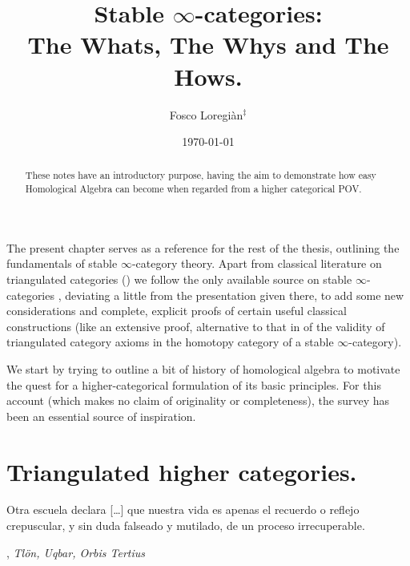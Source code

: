 \documentclass[11pt, a4paper]{amsart}
\providecommand{\omissis}{[\dots\unkern] }
\def\DefaultEpigraphWidth{.4\textwidth}
\begin{document}
\title[Lurification]{Stable $\infty$-categories: \\ The Whats, The Whys and The Hows. }
 
	\author[F. Loregian]{Fosco Loregi\`an${}^\ddag$}
		
\date{\today}

\begin{abstract}
These notes have an introductory purpose, having the aim to demonstrate how easy Homological Algebra can become when regarded from a higher categorical POV.
\end{abstract}

\subjclass[2010]{}
\maketitle 

The present chapter serves as a reference for the rest of the thesis, outlining the fundamentals of stable $\infty$-category theory. Apart from classical literature on triangulated categories (\cite{Hol,Nee}) we follow the only available source on stable $\infty$-categories \cite{LurieHA}, deviating a little from the presentation given there, to add some new considerations and complete, explicit proofs of certain useful classical constructions (like an extensive proof, alternative to that in \cite{LurieHA} of the validity of triangulated category axioms in the homotopy category of a stable $\infty$-category). 

We start by trying to outline a bit of history of homological algebra to motivate the quest for a higher-categorical formulation of its basic principles. For this account (which makes no claim of originality or completeness), the survey \cite{Weibel1997history} has been an essential source of inspiration.
\section{Triangulated higher categories.}
\setlength{\epigraphwidth}{.6\textwidth}
\epigraph{Otra escuela declara \omissis que nuestra vida es apenas el recuerdo o reflejo crepuscular, y sin duda falseado y mutilado, de un proceso irrecuperable.}{\cite{Borges1963}, \emph{Tl\"on, Uqbar, Orbis Tertius}}
\setlength{\epigraphwidth}{\DefaultEpigraphWidth}
\end{document}
